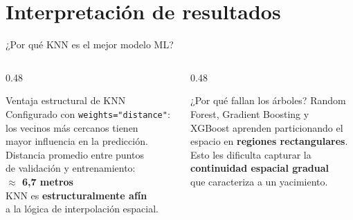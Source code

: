 \documentclass[10pt, aspectratio=169]{beamer}
\newcommand{\hl}[1]{\textcolor{accent}{\textbf{#1}}}
\newcommand{\emp}[1]{\textcolor{primary}{\textbf{#1}}}
\begin{document}
	\section{Interpretación de resultados}
	
	\begin{frame}{¿Por qué KNN es el mejor modelo ML?}
		\begin{columns}[T]
			\begin{column}{0.48\textwidth}
				\begin{block}{Ventaja estructural de KNN}
					Configurado con \texttt{weights="distance"}:\\
					los vecinos más cercanos tienen\\
					mayor influencia en la predicción.\\[6pt]
					Distancia promedio entre puntos\\
					de validación y entrenamiento:\\
					\hl{$\approx$ 6,7 metros}\\[6pt]
					KNN es \emp{estructuralmente afín}\\
					a la lógica de interpolación espacial.
				\end{block}
			\end{column}
			\begin{column}{0.48\textwidth}
				\begin{alertblock}{¿Por qué fallan los árboles?}
					Random Forest, Gradient Boosting y\\
					XGBoost aprenden particionando el\\
					espacio en \textbf{regiones rectangulares}.\\[6pt]
					Esto les dificulta capturar la\\
					\textbf{continuidad espacial gradual}\\
					que caracteriza a un yacimiento.
				\end{alertblock}
			\end{column}
		\end{columns}
	\end{frame}
	
\end{document}
